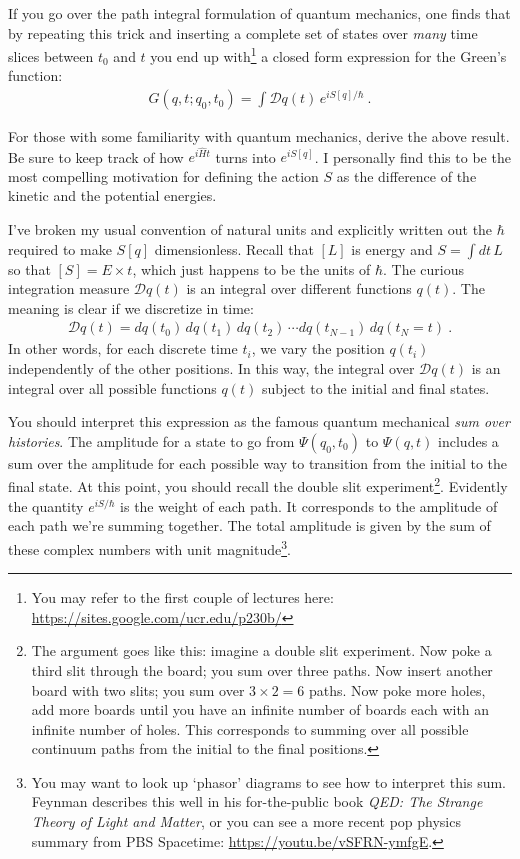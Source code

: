 If you go over the path integral formulation of quantum mechanics, one finds that by repeating this trick and inserting a complete set of states over \emph{many} time slices between $t_0$ and $t$ you end up with\footnote{You may refer to the first couple of lectures here: \url{https://sites.google.com/ucr.edu/p230b/}} a closed form expression for the Green's function:
\begin{align}
	G(q,t;q_0,t_0)  = \int \mathcal Dq(t) \, e^{iS[q]/\hbar} \ .
	\label{eq:G:QM}
\end{align}
\begin{exercise}
For those with some familiarity with quantum mechanics, derive the above result. Be sure to keep track of how $e^{i\hat H t}$ turns into $e^{iS[q]}$. I personally find this to be the most compelling motivation for defining the action $S$ as the difference of the kinetic and the potential energies. 
\end{exercise}
I've broken my usual convention of natural units and explicitly written out the $\hbar$ required to make $S[q]$ dimensionless. Recall that $[L]$ is energy and $S = \int dt \, L$ so that $[S] = E\times t$, which just happens to be the units of $\hbar$. The curious integration measure $\mathcal Dq(t)$ is an integral over different functions $q(t)$. The meaning is clear if we discretize in time:
\begin{align}
	\mathcal D q(t) = dq(t_0)\,dq(t_1)\,dq(t_2)\,\cdots dq(t_{N-1})\,dq(t_N = t) \ .
\end{align}
In other words, for each discrete time $t_i$, we vary the position $q(t_i)$ independently of the other positions. In this way, the integral over $\mathcal D q(t)$ is an integral over all possible functions $q(t)$ subject to the initial and final states.

You should interpret this expression as the famous quantum mechanical \emph{sum over histories}. The amplitude for a state to go from $\Psi(q_0,t_0)$ to $\Psi(q,t)$ includes a sum over the amplitude for each possible way to transition from the initial to the final state. At this point, you should recall the double slit experiment\footnote{The argument goes like this: imagine a double slit experiment. Now poke a third slit through the board; you sum over three paths. Now insert another board with two slits; you sum over $3\times 2 = 6$ paths. Now poke more holes, add more boards until you have an infinite number of boards each with an infinite number of holes. This corresponds to summing over all possible continuum paths from the initial to the final positions.}.
%
Evidently the quantity $e^{iS/\hbar}$ is the weight of each path. It corresponds to the amplitude of each path we're summing together. The total amplitude is given by the sum of these complex numbers with unit magnitude\footnote{You may want to look up `phasor' diagrams to see how to interpret this sum. Feynman describes this well in his for-the-public book \emph{QED: The Strange Theory of Light and Matter}, or you can see a more recent pop physics summary from PBS Spacetime: \url{https://youtu.be/vSFRN-ymfgE}.}.

